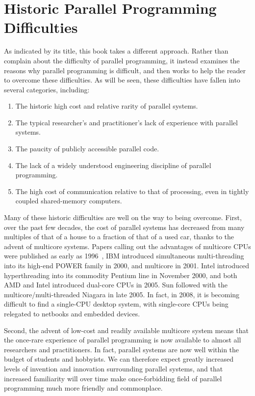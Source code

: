 \section{Historic Parallel Programming Difficulties}
\label{sec:intro:Historic Parallel Programming Difficulties}

As indicated by its title, this book takes a different approach.
Rather than complain about the difficulty of parallel programming,
it instead examines the reasons why parallel programming is
difficult, and then works to help the reader to overcome these
difficulties.
As will be seen, these difficulties have fallen into several categories,
including:

\begin{enumerate}
\item	The historic high cost and relative rarity of parallel systems.
\item	The typical researcher's and practitioner's lack of experience
	with parallel systems.
\item	The paucity of publicly accessible parallel code.
\item	The lack of a widely understood engineering discipline of
	parallel programming.
\item	The high cost of communication relative to that of processing,
	even in tightly coupled shared-memory computers.
\end{enumerate}

Many of these historic difficulties are well on the way to being overcome.
First, over the past few decades, the cost of parallel systems
has decreased from many multiples of that of a house to a fraction of 
that of a used car, thanks to the advent of multicore systems.
Papers calling out the advantages of multicore CPUs were published
as early as 1996~\cite{Olukotun96}, IBM introduced simultaneous multi-threading
into its high-end POWER family in 2000, and multicore in 2001.
Intel introduced hyperthreading into its commodity Pentium line in
November 2000, and both AMD and Intel introduced
dual-core CPUs in 2005.
Sun followed with the multicore/multi-threaded Niagara in late 2005.
In fact, in 2008, it is becoming difficult
to find a single-CPU desktop system, with single-core CPUs being
relegated to netbooks and embedded devices.

Second, the advent of low-cost and readily available multicore system
means that the once-rare experience of parallel programming is
now available to almost all researchers and practitioners.
In fact, parallel systems are now well within the budget of students
and hobbyists.
We can therefore expect greatly increased levels of invention and
innovation surrounding parallel systems, and that increased familiarity
will over time make once-forbidding field of parallel programming
much more friendly and commonplace.

